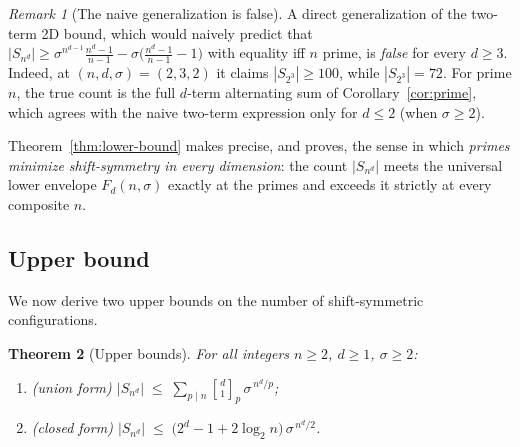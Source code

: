 \documentclass[11pt,a4paper]{article}
\newtheorem{theorem}{Theorem}[section]
\theoremstyle{remark}
\newtheorem{remark}[theorem]{Remark}
\newcommand{\gaussbinom}[2]{\genfrac{[}{]}{0pt}{}{#1}{#2}}
\begin{document}
\begin{remark}[The naive generalization is false]\label{rem:oldbound-false}
A direct generalization of the two-term 2D bound, which would naively predict that
$|S_{n^d}|\ge\sigma^{n^{d-1}}\tfrac{n^d-1}{n-1}
-\sigma\bigl(\tfrac{n^d-1}{n-1}-1\bigr)$ with equality iff $n$ prime, is
\emph{false} for every $d\ge3$. Indeed, at $(n,d,\sigma)=(2,3,2)$ it claims
$|S_{2^3}|\ge100$, while $|S_{2^3}|=72$. For prime $n$, the true count is
the full $d$-term alternating sum of Corollary~\ref{cor:prime}, which
agrees with the naive two-term expression only for $d\le2$ (when $\sigma\ge2$).
\end{remark}

Theorem~\ref{thm:lower-bound} makes precise, and proves, the sense in
which \emph{primes minimize shift-symmetry in every dimension}: the count
$|S_{n^d}|$ meets the universal lower envelope $F_d(n,\sigma)$ exactly at
the primes and exceeds it strictly at every composite $n$.

\subsection{Upper bound}

We now derive two upper bounds on the number of shift-symmetric configurations.






\begin{theorem}[Upper bounds]\label{thm:upper-bound}
For all integers $n\ge2$, $d\ge1$, $\sigma\ge2$:
\begin{enumerate}[label=(\roman*)]
\item (union form)\quad
$\displaystyle |S_{n^d}| \;\le\; \sum_{p\mid n}\gaussbinom d1_p\,
\sigma^{\,n^d/p}$;
\item (closed form)\quad
$\displaystyle |S_{n^d}| \;\le\; \bigl(2^d-1+2\log_2 n\bigr)\,
\sigma^{\,n^d/2}$.
\end{enumerate}
\end{theorem}
\end{document}
